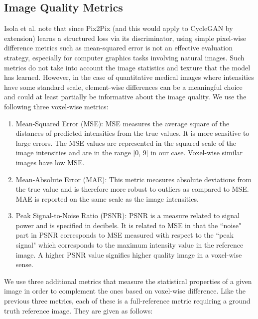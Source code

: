 \subsection{Image Quality Metrics}
\label{image_quality_metrics}
Isola et al. \cite{isola2017image} note that since Pix2Pix (and this would apply to CycleGAN by extension) learns a structured loss via its discriminator, using simple pixel-wise difference metrics such as mean-squared error is not an effective evaluation strategy, especially for computer graphics tasks involving natural images. Such metrics do not take into account the image statistics and texture that the model has learned. However, in the case of quantitative medical images where intensities have some standard scale, element-wise differences can be a meaningful choice and could at least partially be informative about the image quality. We use the following three voxel-wise metrics:

\begin{enumerate}
    \item Mean-Squared Error (MSE): MSE measures the average square of the distances of predicted intensities from the true values. It is more sensitive to large errors. The MSE values are represented in the squared scale of the image intensities and are in the range [0, 9] in our case. Voxel-wise similar images have low MSE.
    \item Mean-Absolute Error (MAE): This metric measures absolute deviations from the true value and is therefore more robust to outliers as compared to MSE. MAE is reported on the same scale as the image intensities.
    \item Peak Signal-to-Noise Ratio (PSNR): PSNR is a measure related to signal power and is specified in decibels. It is related to MSE in that the ``noise" part in PSNR corresponds to MSE measured with respect to the ``peak signal" which corresponds to the maximum intensity value in the reference image. A higher PSNR value signifies higher quality image in a voxel-wise sense.
\end{enumerate}

We use three additional metrics that measure the statistical properties of a given image in order to complement the ones based on voxel-wise difference. Like the previous three metrics, each of these is a full-reference metric requiring a ground truth reference image. They are given as follows:

